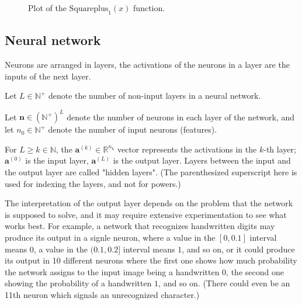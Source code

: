 \documentclass{article}
\begin{document}
          \begin{figure}[!htb]
            \centering
            \caption{%
              Plot of the $\text{Squareplus}_{1}(x)$ function.
            }
          \end{figure}

    \subsection{Neural network}

      Neurons are arranged in layers, the activations of the neurons in a layer
      are the inputs of the next layer.

      Let $L \in \mathbb{N}^+$ denote the number of non-input layers in a
      neural network.

      Let $\mathbf{n} \in \left( {\mathbb{N}^+} \right)^L$ denote the number of
      neurons in each layer of the network, and let $n_0 \in \mathbb{N}^+$
      denote the number of input neurons (features).

      For $L \geq k \in \mathbb{N}$, the $\mathbf{a}^{(k)} \in
      \mathbb{R}^{n_k}$ vector represents the activations in the $k$-th layer;
      $\mathbf{a}^{(0)}$ is the input layer, $\mathbf{a}^{(L)}$ is the output
      layer. Layers between the input and the output layer are called "hidden
      layers". (The parenthesized superscript here is used for indexing the
      layers, and not for powers.)

      The interpretation of the output layer depends on the problem that the
      network is supposed to solve, and it may require extensive experimentation
      to see what works best. For example, a network that recognizes
      handwritten digits may produce its output in a signle neuron, where a
      value in the $[0, 0.1]$ interval means $0$, a value in the $(0.1, 0.2]$
      interval means $1$, and so on, or it could produce its output in 10
      different neurons where the first one shows how much probability the
      network assigns to the input image being a handwritten $0$, the second one
      showing the probability of a handwritten $1$, and so on. (There could even
      be an 11th neuron which signals an unrecognized character.)
\end{document}
